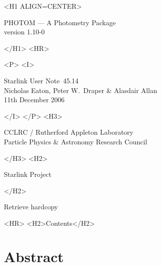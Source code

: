 \documentclass[twoside,11pt]{article}
\newcommand{\stardoccategory}  {Starlink User Note}
\newcommand{\stardocsource}    {sun\stardocnumber}
\newcommand{\stardocnumber}    {45.14}
\newcommand{\stardocauthors}   {Nicholas Eaton, Peter W.\ Draper \& Alasdair Allan}
\newcommand{\stardocdate}      {11th December 2006}
\newcommand{\stardoctitle}     {PHOTOM --- A Photometry Package }
\newcommand{\stardocversion}   {version 1.10-0}
\newcommand{\htmladdnormallink}[2]{#1}
\newcommand{\htmladdimg}[1]{}
\newcommand{\htmlref}[2]{#1}
\newcommand{\htmladdtonavigation}[1]{}
\newcommand{\xlabel}[1]{}
\renewcommand{\_}{\texttt{\symbol{95}}}
\begin{document}
\begin{htmlonly}
   \xlabel{}
   \begin{rawhtml} <H1 ALIGN=CENTER> \end{rawhtml}
      \stardoctitle\\
      \stardocversion

    \htmladdimg{sun45fig.gif}

   \begin{rawhtml} </H1> <HR> \end{rawhtml}

   \begin{rawhtml} <P> <I> \end{rawhtml}
   \stardoccategory\ \stardocnumber \\
   \stardocauthors \\
   \stardocdate
   \begin{rawhtml} </I> </P> <H3> \end{rawhtml}
      \htmladdnormallink{CCLRC}{http://www.cclrc.ac.uk} /
      \htmladdnormallink{Rutherford Appleton Laboratory}
                        {http://www.cclrc.ac.uk/ral} \\
      \htmladdnormallink{Particle Physics \& Astronomy Research Council}
                        {http://www.pparc.ac.uk} \\
   \begin{rawhtml} </H3> <H2> \end{rawhtml}
      \htmladdnormallink{Starlink Project}{http://star-www.rl.ac.uk/}
   \begin{rawhtml} </H2> \end{rawhtml}
   \htmladdnormallink{\htmladdimg{source.gif} Retrieve hardcopy}
      {http://star-www.rl.ac.uk/cgi-bin/hcserver?\stardocsource}\\

  \label{stardoccontents}
  \begin{rawhtml}
    <HR>
    <H2>Contents</H2>
  \end{rawhtml}
  \htmladdtonavigation{\htmlref{\htmladdimg{contents_motif.gif}}
        {stardoccontents}}

  \section{\xlabel{abstract}Abstract}
\end{htmlonly}
\end{document}
